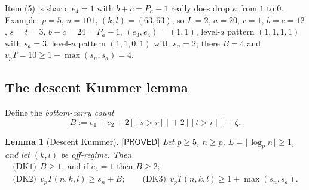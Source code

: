 \documentclass[11pt,reqno]{amsart}
\theoremstyle{plain}
\newtheorem{lemma}[theorem]{Lemma}
\theoremstyle{definition}
\theoremstyle{remark}
\numberwithin{equation}{section}
\newcommand{\ii}[1]{[\![#1]\!]}
\newcommand{\PROVED}{\textsf{[PROVED]}}
\begin{document}
Item (5) is sharp: $e_4=1$ with $b+c=P_a-1$ really does drop $\kappa$ from $1$ to $0$. Example:
$p=5$, $n=101$, $(k,l)=(63,63)$, so $L=2$, $a=20$, $r=1$, $b=c=12$, $s=t=3$, $b+c=24=P_a-1$,
$(e_3,e_4)=(1,1)$, level-$a$ pattern $(1,1,1,1)$ with $s_a=3$, level-$n$ pattern $(1,1,0,1)$
with $s_n=2$; there $B=4$ and $v_pT=10\ge1+\max(s_n,s_a)=4$.

\subsection{The descent Kummer lemma}

Define the \emph{bottom-carry count}
\begin{equation}\label{eq:Bcount}
B:=e_1+e_2+2\ii{s>r}+2\ii{t>r}+\zeta .
\end{equation}

\begin{lemma}[Descent Kummer]\label{lem:DK}
$\PROVED$ Let $p\ge5$, $n\ge p$, $L=\lfloor\log_pn\rfloor\ge1$, and let $(k,l)$ be off-regime.
Then
\[
\begin{gathered}
\text{(DK1)}\ \ B\ge1,\ \text{and if } e_4=1 \text{ then } B\ge2;\\
\text{(DK2)}\ \ v_pT(n,k,l)\ge s_n+B;\qquad
\text{(DK3)}\ \ v_pT(n,k,l)\ge1+\max(s_n,s_a).
\end{gathered}
\]
\end{lemma}
\end{document}
